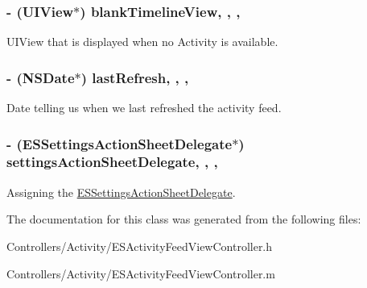 \subsubsection[{blank\+Timeline\+View}]{\setlength{\rightskip}{0pt plus 5cm}-\/ (U\+I\+View$\ast$) blank\+Timeline\+View\hspace{0.3cm}{\ttfamily [read]}, {\ttfamily [write]}, {\ttfamily [nonatomic]}, {\ttfamily [strong]}}\label{interface_e_s_activity_feed_view_controller_aa8e9edffa720c942cd9f6707881fe212}
U\+I\+View that is displayed when no Activity is available. \hypertarget{interface_e_s_activity_feed_view_controller_ab30b81f8f8ad9fc0ece4b0bc385ef96e}{}
\subsubsection[{last\+Refresh}]{\setlength{\rightskip}{0pt plus 5cm}-\/ (N\+S\+Date$\ast$) last\+Refresh\hspace{0.3cm}{\ttfamily [read]}, {\ttfamily [write]}, {\ttfamily [nonatomic]}, {\ttfamily [strong]}}\label{interface_e_s_activity_feed_view_controller_ab30b81f8f8ad9fc0ece4b0bc385ef96e}
Date telling us when we last refreshed the activity feed. \hypertarget{interface_e_s_activity_feed_view_controller_a4bb937986f4f6806a71200cd3f8ba7e5}{}
\subsubsection[{settings\+Action\+Sheet\+Delegate}]{\setlength{\rightskip}{0pt plus 5cm}-\/ ({\bf E\+S\+Settings\+Action\+Sheet\+Delegate}$\ast$) settings\+Action\+Sheet\+Delegate\hspace{0.3cm}{\ttfamily [read]}, {\ttfamily [write]}, {\ttfamily [nonatomic]}, {\ttfamily [strong]}}\label{interface_e_s_activity_feed_view_controller_a4bb937986f4f6806a71200cd3f8ba7e5}
Assigning the \hyperlink{interface_e_s_settings_action_sheet_delegate}{E\+S\+Settings\+Action\+Sheet\+Delegate}. 

The documentation for this class was generated from the following files\+:\begin{DoxyCompactItemize}
\item 
Controllers/\+Activity/E\+S\+Activity\+Feed\+View\+Controller.\+h\item 
Controllers/\+Activity/E\+S\+Activity\+Feed\+View\+Controller.\+m\end{DoxyCompactItemize}
